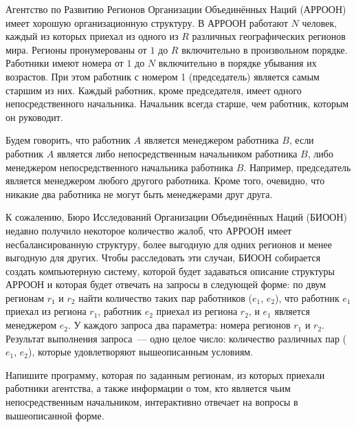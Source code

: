 Агентство по Развитию Регионов Организации Объединённых Наций (АРРООН) имеет хорошую
организационную структуру. В АРРООН работают $N$ человек, каждый из которых приехал из одного из $R$ различных географических регионов мира. Регионы пронумерованы от $1$ до $R$ включительно в произвольном порядке. Работники имеют номера от $1$ до $N$ включительно в порядке убывания их возрастов. При этом работник с номером 1 (председатель) является самым старшим из них. Каждый работник, кроме председателя, имеет одного непосредственного начальника. Начальник всегда старше, чем работник, которым он руководит.

Будем говорить, что работник $A$ является менеджером работника $B$, если работник $A$ является либо непосредственным начальником работника $B$, либо менеджером непосредственного начальника работника $B$. Например, председатель является менеджером любого другого работника. Кроме того, очевидно, что никакие два работника не могут быть менеджерами друг друга.

К сожалению, Бюро Исследований Организации Объединённых Наций (БИООН) недавно получило
некоторое количество жалоб, что АРРООН имеет несбалансированную структуру, более выгодную для одних регионов и менее выгодную для других. Чтобы расследовать эти случаи, БИООН собирается создать компьютерную систему, которой будет задаваться описание структуры АРРООН и которая будет отвечать на запросы в следующей форме: по двум регионам $r_1$ и $r_2$ найти количество таких пар работников ($e_1$, $e_2$), что работник $e_1$ приехал из региона $r_1$, работник $e_2$ приехал из региона $r_2$, и $e_1$ является менеджером $e_2$. У каждого запроса два параметра: номера регионов $r_1$ и $r_2$. Результат выполнения запроса~--- одно целое число: количество различных пар ($e_1$, $e_2$), которые удовлетворяют вышеописанным условиям.

Напишите программу, которая по заданным регионам, из которых приехали работники агентства, а также информации о том, кто является чьим непосредственным начальником, интерактивно отвечает на вопросы в вышеописанной форме.